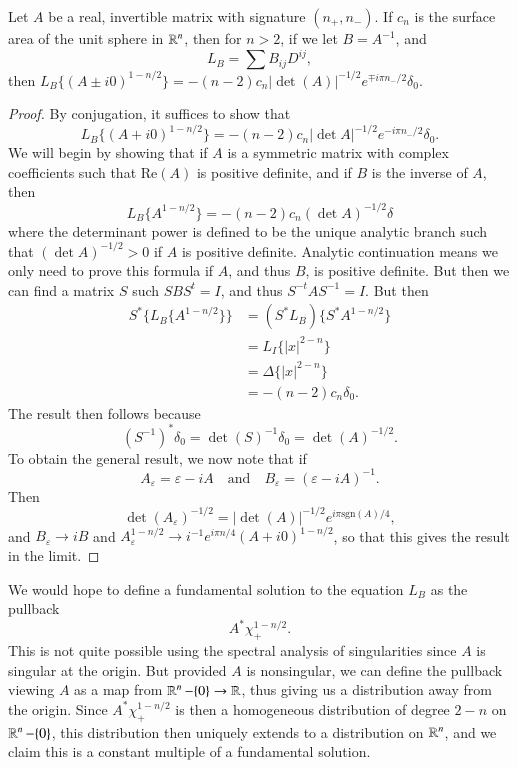 \begin{lemma}
    Let $A$ be a real, invertible matrix with signature $(n_+,n_-)$. If $c_n$ is the surface area of the unit sphere in $\operatorname{\mathbb{R}}^n$, then for $n > 2$, if we let $B = A^{-1}$, and
    \[ L_B = \sum B_{ij} D^{ij}, \]
    then $L_B \{ (A \pm i 0)^{1 - n/2} \} = - (n-2) c_n |\det(A)|^{-1/2} e^{\mp i \pi n_- / 2} \delta_0$.
\end{lemma}
\begin{proof}
    By conjugation, it suffices to show that
    \[ L_B \{ (A + i 0)^{1-n/2} \} = - (n-2) c_n |\det A|^{-1/2} e^{- i \pi n_- / 2} \delta_0. \]
    We will begin by showing that if $A$ is a symmetric matrix with complex coefficients such that $\text{Re}(A)$ is positive definite, and if $B$ is the inverse of $A$, then
    \[ L_B \{ A^{1-n/2} \} = -(n-2) c_n (\det A)^{-1/2} \delta \]
    where the determinant power is defined to be the unique analytic branch such that $(\det A)^{-1/2} > 0$ if $A$ is positive definite. Analytic continuation means we only need to prove this formula if $A$, and thus $B$, is positive definite. But then we can find a matrix $S$ such $S B S^t = I$, and thus $S^{-t} A S^{-1} = I$. But then
    \begin{align*}
        S^* \{ L_B \{ A^{1-n/2} \} \} &= (S^* L_B) \{ S^* A^{1-n/2} \}\\
        &=  L_I \{ |x|^{2-n} \}\\
        &= \Delta \{ |x|^{2-n} \}\\
        &= - (n-2) c_n \delta_0.
    \end{align*}
    The result then follows because
    \[ (S^{-1})^* \delta_0 = \det(S)^{-1} \delta_0 = \det(A)^{-1/2}. \]
    To obtain the general result, we now note that if
    \[ A_\varepsilon = \varepsilon - i A \quad\text{and}\quad B_\varepsilon = (\varepsilon - iA)^{-1}. \]
    Then
    \[ \det(A_\varepsilon)^{-1/2} = |\det(A)|^{-1/2} e^{i \pi \text{sgn}(A) / 4}, \]
    and $B_\varepsilon \to i B$ and $A_\varepsilon^{1-n/2} \to i^{-1} e^{i \pi n / 4} (A + i0)^{1-n/2}$, so that this gives the result in the limit.
\end{proof}
 
We would hope to define a fundamental solution to the equation $L_B$ as the pullback
%
\[ A^* \chi_+^{1-n/2}. \]
%
This is not quite possible using the spectral analysis of singularities since $A$ is singular at the origin. But provided $A$ is nonsingular, we can define the pullback viewing $A$ as a map from $\operatorname{\mathbb{R}}^n - \{ 0 \} \to \operatorname{\mathbb{R}}$, thus giving us a distribution away from the origin. Since $A^* \chi_+^{1-n/2}$ is then a homogeneous distribution of degree $2-n$ on $\operatorname{\mathbb{R}}^n - \{ 0 \}$, this distribution then uniquely extends to a distribution on $\operatorname{\mathbb{R}}^n$, and we claim this is a constant multiple of a fundamental solution.

